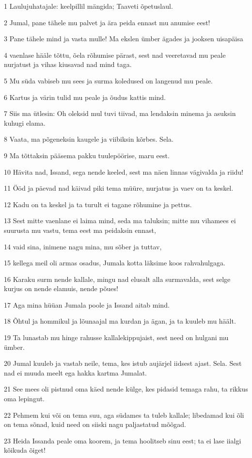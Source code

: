\par 1 Laulujuhatajale: keelpillil mängida; Taaveti õpetuslaul.
\par 2 Jumal, pane tähele mu palvet ja ära peida ennast mu anumise eest!
\par 3 Pane tähele mind ja vasta mulle! Ma ekslen ümber ägades ja jooksen uisapäisa
\par 4 vaenlase hääle tõttu, õela rõhumise pärast, sest nad veeretavad mu peale nurjatust ja vihas kiusavad nad mind taga.
\par 5 Mu süda vabiseb mu sees ja surma koledused on langenud mu peale.
\par 6 Kartus ja värin tulid mu peale ja õudus kattis mind.
\par 7 Siis ma ütlesin: Oh oleksid mul tuvi tiivad, ma lendaksin minema ja asuksin kuhugi elama.
\par 8 Vaata, ma põgeneksin kaugele ja viibiksin kõrbes. Sela.
\par 9 Ma tõttaksin pääsema pakku tuulepöörise, maru eest.
\par 10 Hävita nad, Issand, sega nende keeled, sest ma näen linnas vägivalda ja riidu!
\par 11 Ööd ja päevad nad käivad piki tema müüre, nurjatus ja vaev on ta keskel.
\par 12 Kadu on ta keskel ja ta turult ei tagane rõhumine ja pettus.
\par 13 Sest mitte vaenlane ei laima mind, seda ma taluksin; mitte mu vihamees ei suurusta mu vastu, tema eest ma peidaksin ennast,
\par 14 vaid sina, inimene nagu mina, mu sõber ja tuttav,
\par 15 kellega meil oli armas osadus, Jumala kotta läksime koos rahvahulgaga.
\par 16 Karaku surm nende kallale, mingu nad elusalt alla surmavalda, sest selge kurjus on nende elamuis, nende põues!
\par 17 Aga mina hüüan Jumala poole ja Issand aitab mind.
\par 18 Õhtul ja hommikul ja lõunaajal ma kurdan ja ägan, ja ta kuuleb mu häält.
\par 19 Ta lunastab mu hinge rahusse kallalekippujaist, sest need on hulgani mu ümber.
\par 20 Jumal kuuleb ja vastab neile, tema, kes istub aujärjel iidsest ajast. Sela. Sest nad ei muuda meelt ega hakka kartma Jumalat.
\par 21 See mees oli pistnud oma käed nende külge, kes pidasid temaga rahu, ta rikkus oma lepingut.
\par 22 Pehmem kui või on tema suu, aga südames ta tuleb kallale; libedamad kui õli on tema sõnad, kuid need on siiski nagu paljastatud mõõgad.
\par 23 Heida Issanda peale oma koorem, ja tema hoolitseb sinu eest; ta ei lase iialgi kõikuda õiget!

